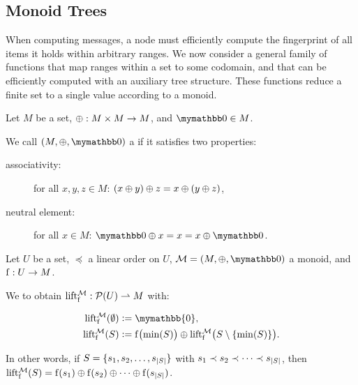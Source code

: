 \documentclass[conference]{IEEEtran}
\begin{document}
\subsection{Monoid Trees}

When computing messages, a node must efficiently compute the fingerprint of all items it holds within arbitrary ranges. We now consider a general family of functions that map ranges within a set to some codomain, and that can be efficiently computed with an auxiliary tree structure. These functions reduce a finite set to a single value according to a monoid.

\begin{definition}
Let $M$ be a set, $\oplus: M \times M \rightarrow M$, and $\neutraladd \in M$.

We call $(M, \groupaddsym, \neutraladd)$ a  if it satisfies two properties:

  \begin{description}
    \item[associativity:] for all $x, y, z \in M$: ${({x} \oplus {y})} \oplus {z} = {x} \oplus {({y} \oplus{z})}$,
    \item[neutral element:] for all $x \in M$: $\groupadd{\neutraladd}{x} = x = \groupadd{x}{\neutraladd}$.
  \end{description}
\end{definition}

\begin{definition}
\label{def-lift}
Let $U$ be a set, $\preceq$ a linear order on $U$, $\mathcal{M} = (M, \groupaddsym, \neutraladd)$ a monoid, and ${\operatorname{f}}: {U} \rightarrow {M}$.

We  to obtain ${\operatorname{lift_{\operatorname{f}}^{\mathcal{M}}}}: {\mathcal{P}({U})} \rightharpoonup{M}$ with:

\begin{align*}
\lift{\f}{\mathcal{M}}(\emptyset) &\defeq \mymathbb{0},\\
\lift{\f}{\mathcal{M}}(S) &\defeq \f\bigl(\min(S)\bigr) \oplus \lift{\f}{\mathcal{M}}\bigl(S \setminus \set{\min(S)}\bigr).\\
\end{align*}

In other words, if $S = \{s_1, s_2, \ldots, s_{|{S}|}\}$ with $s_1 \prec s_2 \prec \cdots \prec s_{|{S}|}$, then $\operatorname{lift_{\operatorname{f}}^{\mathcal{M}}}(S) = {\operatorname{f}(s_1)} \oplus {{\operatorname{f}(s_2)} \oplus{{\cdots} \oplus{\operatorname{f}(s_{|{S}|})}}}$.
\end{definition}
\end{document}
